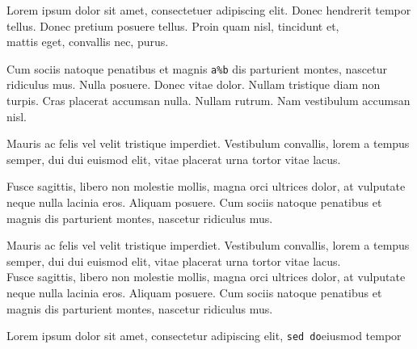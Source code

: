 Lorem ipsum dolor sit amet, consectetuer adipiscing elit. Donec
hendrerit tempor tellus. Donec pretium posuere tellus. Proin quam
nisl, tincidunt et, \\%
mattis eget, convallis nec, purus.

Cum sociis natoque penatibus et magnis \verb|a%b| dis parturient
montes, nascetur ridiculus mus. Nulla posuere. Donec vitae
dolor. Nullam tristique diam non turpis.  Cras placerat accumsan
nulla. Nullam rutrum. Nam vestibulum accumsan nisl.

Mauris ac felis vel velit tristique imperdiet.  Vestibulum convallis,
lorem a tempus semper, dui dui euismod elit, vitae placerat urna
tortor vitae lacus.\par
Fusce sagittis, libero non molestie mollis, magna orci ultrices dolor,
at vulputate neque nulla lacinia eros.  Aliquam posuere.  Cum sociis
natoque penatibus et magnis dis parturient montes, nascetur ridiculus
mus.%

Mauris ac felis vel velit tristique imperdiet.  Vestibulum convallis,
lorem a
tempus semper, dui dui euismod elit, vitae placerat urna tortor vitae lacus.\\
Fusce sagittis, libero non molestie mollis, magna orci ultrices dolor,
at vulputate neque nulla lacinia eros.  Aliquam posuere.  Cum sociis
natoque penatibus et magnis dis parturient montes, nascetur ridiculus
mus.%

Lorem ipsum dolor sit amet, consectetur adipiscing elit,
\verb|sed do|eiusmod tempor
